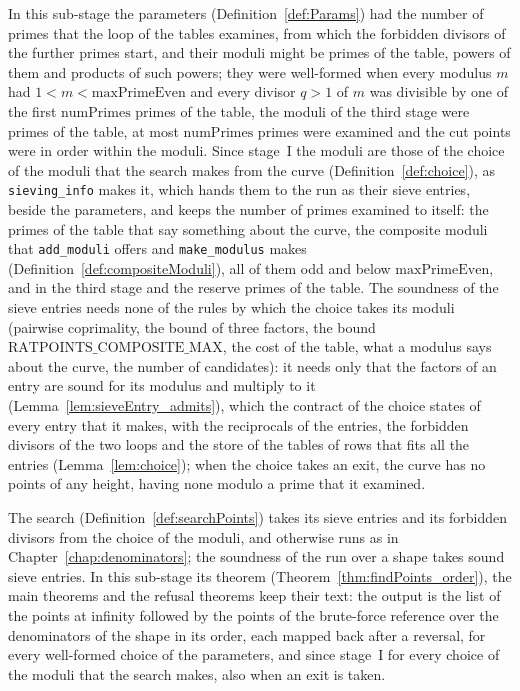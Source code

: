 In this sub-stage the parameters (Definition~\ref{def:Params}) had the number of primes that the
loop of the tables examines, from which the forbidden divisors of the further primes start, and
their moduli might be primes of the table, powers of them and products of such powers; they were
well-formed when every modulus $m$ had $1 < m < \mathrm{maxPrimeEven}$ and every divisor $q > 1$ of
$m$ was divisible by one of the first $\mathrm{numPrimes}$ primes of the table, the moduli of the
third stage were primes of the table, at most $\mathrm{numPrimes}$ primes were examined and the cut
points were in order within the moduli. Since stage~I the moduli are those of the choice of the
moduli that the search makes from the curve (Definition~\ref{def:choice}), as \verb|sieving_info|
makes it, which hands them to the run as their sieve entries, beside the parameters, and keeps the
number of primes examined to itself: the primes of the table that say something about the curve, the
composite moduli that \verb|add_moduli| offers and \verb|make_modulus| makes
(Definition~\ref{def:compositeModuli}), all of them odd and below $\mathrm{maxPrimeEven}$, and in
the third stage and the reserve primes of the table. The soundness of the sieve entries needs none
of the rules by which the choice takes its moduli (pairwise coprimality, the bound of three factors,
the bound $\mathrm{RATPOINTS\_COMPOSITE\_MAX}$, the cost of the table, what a modulus says about the
curve, the number of candidates): it needs only that the factors of an entry are sound for its
modulus and multiply to it (Lemma~\ref{lem:sieveEntry_admits}), which the contract of the choice
states of every entry that it makes, with the reciprocals of the entries, the forbidden divisors of
the two loops and the store of the tables of rows that fits all the entries
(Lemma~\ref{lem:choice}); when the choice takes an exit, the curve has no points of any height,
having none modulo a prime that it examined.

The search (Definition~\ref{def:searchPoints}) takes its sieve entries and its forbidden divisors
from the choice of the moduli, and otherwise runs as in Chapter~\ref{chap:denominators}; the
soundness of the run over a shape takes sound sieve entries. In this sub-stage its theorem
(Theorem~\ref{thm:findPoints_order}), the main theorems and the refusal theorems keep their text:
the output is the list of the points at infinity followed by the points of the brute-force reference
over the denominators of the shape in its order, each mapped back after a reversal, for every
well-formed choice of the parameters, and since stage~I for every choice of the moduli that the
search makes, also when an exit is taken.

